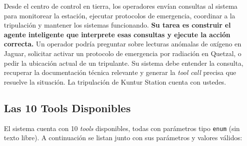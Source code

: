 \documentclass{article}
\begin{document}
Desde el centro de control en tierra, los operadores envían consultas al sistema para monitorear la estación, ejecutar protocolos de emergencia, coordinar a la tripulación y mantener los sistemas funcionando. \textbf{Su tarea es construir el agente inteligente que interprete esas consultas y ejecute la acción correcta.} Un operador podría preguntar sobre lecturas anómalas de oxígeno en Jaguar, solicitar activar un protocolo de emergencia por radiación en Quetzal, o pedir la ubicación actual de un tripulante. Su sistema debe entender la consulta, recuperar la documentación técnica relevante y generar la \textit{tool call} precisa que resuelve la situación. La tripulación de Kuntur Station cuenta con ustedes.

\subsection{Las 10 Tools Disponibles}
El sistema cuenta con 10 \textit{tools} disponibles, todas con parámetros tipo \texttt{enum} (sin texto libre). A continuación se listan junto con sus parámetros y valores válidos:
\end{document}
